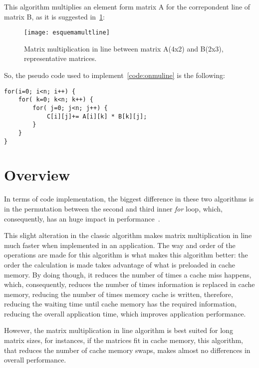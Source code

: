 This algorithm multiplies an element form matrix A for the correpondent line of matrix B, as it is suggested in~\ref{fig:esquemamultline}:

\begin{figure}[htb]
	\begin{center}
		\leavevmode
		\texttt{[image: esquemamultline]}
		\caption{Matrix multiplication in line between matrix A(4x2) and  B(2x3), representative matrices.}
		\label{fig:esquemamultline}
	\end{center}
\end{figure}

So, the pseudo code used to implement~\ref{code:onmuline} is the following:

\begin{lstlisting}
for(i=0; i<n; i++) {	
	for( k=0; k<n; k++) {	
		for( j=0; j<n; j++) {	
			C[i][j]+= A[i][k] * B[k][j];
		}
	}
}
\end{lstlisting}

\section{Overview}

In terms of code implementation, the biggest difference in these two algorithms is in the permutation between the second and third inner \textit{for} loop, which, consequently, has an huge impact in performance~\cite{Lam}.

This slight alteration in the classic algorithm makes matrix multiplication in line much faster when implemented in an application. The way and order of the operations are made for this algorithm is what makes this algorithm better: the order the calculation is made takes advantage of what is preloaded in cache memory. By doing though, it reduces the number of times a cache miss happens, which, consequently, reduces the number of times information is replaced in cache memory, reducing the number of times memory cache is written, therefore, reducing the waiting time until cache memory has the required information, reducing the overall application time, which improves application performance.

However, the matrix multiplication in line algorithm is best suited  for long matrix sizes, for instances, if the matrices fit in cache memory, this algorithm, that reduces the number of cache memory swaps, makes almost no differences in overall performance.
